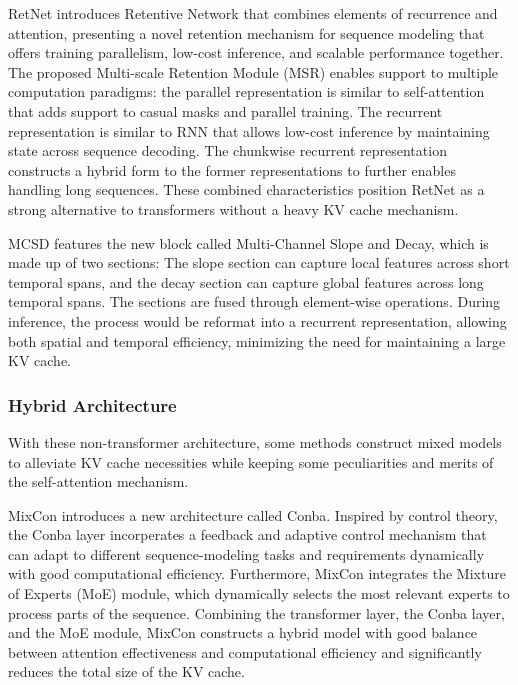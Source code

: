 
RetNet \cite{sunRetentiveNetworkSuccessor2023} introduces Retentive Network that combines elements of recurrence and attention, presenting a novel retention mechanism for sequence modeling that offers training parallelism, low-cost inference, and scalable performance together. The proposed Multi-scale Retention Module (MSR) enables support to multiple computation paradigms: the parallel representation is similar to self-attention that adds support to casual masks and parallel training. The recurrent representation is similar to RNN that allows low-cost inference by maintaining state across sequence decoding. The chunkwise recurrent representation constructs a hybrid form to the former representations to further enables handling long sequences. These combined characteristics position RetNet as a strong alternative to transformers without a heavy KV cache mechanism.

MCSD \cite{yangMCSDEfficientLanguage2024} features the new block called Multi-Channel Slope and Decay, which is made up of two sections: The slope section can capture local features across short temporal spans, and the decay section can capture global features across long temporal spans. The sections are fused through element-wise operations. During inference, the process would be reformat into a recurrent representation, allowing both spatial and temporal efficiency, minimizing the need for maintaining a large KV cache.

\subsubsection{Hybrid Architecture}\label{sec:model_nontrans_ha}

With these non-transformer architecture, some methods construct mixed models to alleviate KV cache necessities while keeping some peculiarities and merits of the self-attention mechanism.

MixCon \cite{xuMixConHybridArchitecture2024} introduces a new architecture called Conba. Inspired by control theory, the Conba layer incorperates a feedback and adaptive control mechanism that can adapt to different sequence-modeling tasks and requirements dynamically with good computational efficiency. Furthermore, MixCon integrates the Mixture of Experts (MoE) module, which dynamically selects the most relevant experts to process parts of the sequence. Combining the transformer layer, the Conba layer, and the MoE module, MixCon constructs a hybrid model with good balance between attention effectiveness and computational efficiency and significantly reduces the total size of the KV cache.


